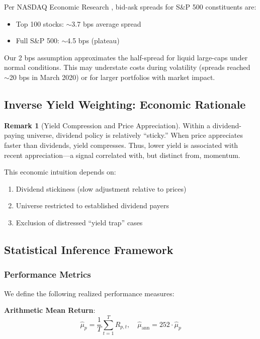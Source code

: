 \documentclass[12pt,a4paper]{article}
\theoremstyle{definition}
\newtheorem{remark}{Remark}
\begin{document}
Per NASDAQ Economic Research \citep{mackintosh2021spreads}, bid-ask spreads for S\&P 500 constituents are:
\begin{itemize}
    \item Top 100 stocks: $\sim$3.7 bps average spread
    \item Full S\&P 500: $\sim$4.5 bps (plateau)
\end{itemize}

Our 2 bps assumption approximates the half-spread for liquid large-caps under normal conditions. This may understate costs during volatility (spreads reached $\sim$20 bps in March 2020) or for larger portfolios with market impact.

\subsection{Inverse Yield Weighting: Economic Rationale}

\begin{remark}[Yield Compression and Price Appreciation]
Within a dividend-paying universe, dividend policy is relatively ``sticky.'' When price appreciates faster than dividends, yield compresses. Thus, lower yield is associated with recent appreciation---a signal correlated with, but distinct from, momentum.
\end{remark}

This economic intuition depends on:
\begin{enumerate}
    \item Dividend stickiness (slow adjustment relative to prices)
    \item Universe restricted to established dividend payers
    \item Exclusion of distressed ``yield trap'' cases
\end{enumerate}

\subsection{Statistical Inference Framework}

\subsubsection{Performance Metrics}

We define the following realized performance measures:

\textbf{Arithmetic Mean Return}:
\begin{equation}
\hat{\mu}_p = \frac{1}{T} \sum_{t=1}^{T} R_{p,t}, \quad \hat{\mu}_{\text{ann}} = 252 \cdot \hat{\mu}_p
\end{equation}
\end{document}
